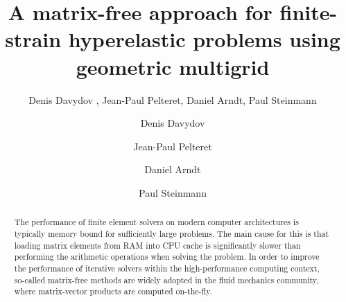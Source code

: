 \documentclass[times,doublespace]{nmeauth}
\begin{document}
\ifijnme
{}
\else
{}
\begin{frontmatter}
\fi

\title{
  A matrix-free approach for finite-strain hyperelastic problems using geometric multigrid
  }

\ifijnme
  \author{
    Denis Davydov \corrauth ,
    Jean-Paul Pelteret,
    Daniel Arndt,
    Paul Steinmann
  }

  \address{
    Chair of Applied Mechanics,
    Friedrich-Alexander-Universit\"{a}t Erlangen-N\"{u}rnberg,
    Egerlandstr.\ 5, 91058 Erlangen, Germany \break
    Interdisciplinary Center for Scientific Computing (IWR),
    Heidelberg University,
    Im Neuenheimer Feld 205, 69120 Heidelberg, Germany \break
    Glasgow Computational Engineering Center (GCEC),
        University of Glasgow, G12 8QQ Glasgow, United Kingdom \break
    }


\else
  \author[a]{Denis Davydov}

  \author[a]{Jean-Paul Pelteret}

  \author[b]{Daniel Arndt}

  \author[a,c]{Paul Steinmann}


  \address[a]{Chair of Applied Mechanics,
  Friedrich-Alexander-Universit\"{a}t Erlangen-N\"{u}rnberg,
  Egerlandstr.\ 5, 91058 Erlangen, Germany}

  \address[b]{Interdisciplinary Center for Scientific Computing (IWR),
      Heidelberg University,
      Im Neuenheimer Feld 205,
      69120 Heidelberg,
      Germany}

  \address[c]{Glasgow Computational Engineering Center (GCEC),
      University of Glasgow, G12 8QQ Glasgow, United Kingdom
  }
\fi


  \begin{abstract}
    The performance of finite element solvers on modern computer architectures is typically memory bound {\color{red} for sufficiently large problems}.
    The main cause for this is that loading matrix elements from RAM into CPU cache is significantly slower than performing the arithmetic operations when solving the problem.
    In order to improve the performance of iterative solvers within the high-performance computing context, so-called matrix-free methods are
    widely adopted in the fluid mechanics community, where matrix-vector products are computed on-the-fly.


\end{abstract}
\end{frontmatter}
\end{document}
